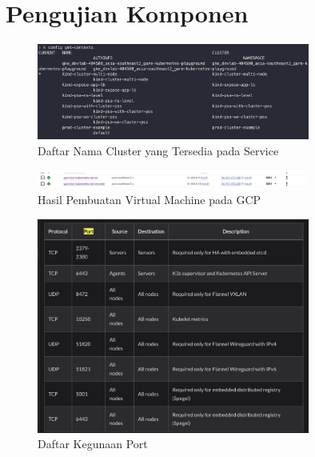 \chapter{Pengujian Komponen}

\begin{figure}[ht]
  \centering
  \includegraphics[width=0.8\textwidth]{resources/chapter-4/pengujian/p00.jpg}
  \caption{Daftar Nama Cluster yang Tersedia pada Service}
  \label{fig:list-cluster-tersedia}
\end{figure}

\begin{figure}[ht]
  \centering
  \includegraphics[width=0.8\textwidth]{resources/chapter-4/pengujian/kube-gcp-01.jpg}
  \caption{Hasil Pembuatan Virtual Machine pada GCP}
  \label{fig:hasil-pembuatan-virtual-machine-gcp}
\end{figure}

\begin{figure}[ht]
  \centering
  \includegraphics[width=0.8\textwidth]{resources/chapter-4/pengujian/kube-gcp-03.jpg}
  \caption{Daftar Kegunaan Port}
  \label{fig:daftar-kegunaan-port}
\end{figure}

